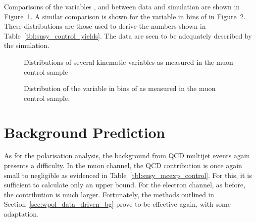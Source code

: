 Comparisons of the variables \STlep, \MT and \Ptmu between data and simulation
are shown in Figure~\ref{fig:susy_mucontrol_kin}. A similar comparison is shown
for the \LP variable in bins of \STlep in
Figure~\ref{fig:susy_mucontrol_lp}. These distributions are those used to derive
the numbers shown in Table~\ref{tbl:susy_control_yields}. The data are seen to
be adequately described by the simulation.
\begin{figure}
\centering
{}\quad
{}\quad
{}
\caption[]{Distributions of several kinematic variables as measured in the muon control sample}
\label{fig:susy_mucontrol_kin}
\end{figure}

\begin{figure}
\centering
{}\quad
{}\quad
{}
\caption{Distribution of the \LP variable in bins of \STlep as measured in the muon control sample.}
\label{fig:susy_mucontrol_lp}
\end{figure}

\section{Background Prediction}
As for the \PW polarisation analysis, the background from \ac{QCD} multijet
events again presents a difficulty. In the muon channel, the \ac{QCD}
contribution is once again small to negligible as evidenced in
Table~\ref{tbl:susy_mcexp_control}. For this, it is sufficient to calculate
only an upper bound. For the electron channel, as before, the contribution is
much larger. Fortunately, the methods outlined in
Section~\ref{sec:wpol_data_driven_bg} prove to be effective again, with some
adaptation.

